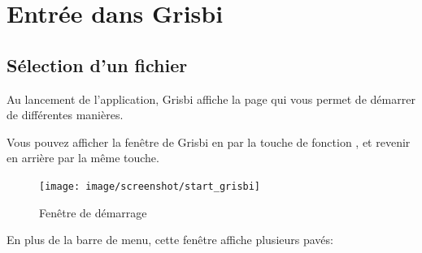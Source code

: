 
\chapter{Entrée dans Grisbi\label{entrance}}

\section{Sélection d'un fichier\label{select-file}}


Au lancement de l'application, Grisbi affiche la page qui vous permet de démarrer de différentes manières.


Vous pouvez afficher la fenêtre de Grisbi en  par la touche de fonction , et revenir en arrière par la même touche.			%


\begin{figure}[htbp]			%
	\begin{center}					%
		\texttt{[image: image/screenshot/start\_grisbi]}		%
	\end{center}
	\caption{Fenêtre de démarrage}			%
	\label{start_grisbi}					%
\end{figure}


En plus de la barre de menu, cette fenêtre affiche plusieurs pavés:

